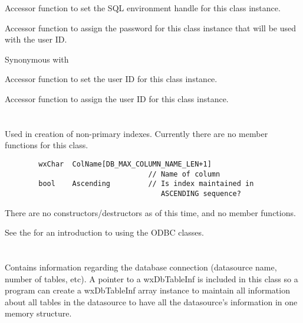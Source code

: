 
Accessor function to set the SQL environment handle for this class instance.

\label{wxdbconnectinfsetpassword}


Accessor function to assign the password for this class
instance that will be used with the user ID.

Synonymous with 

\label{wxdbconnectinfsetuid}


Accessor function to set the user ID for this class instance.

\label{wxdbconnectinfsetuserid}


Accessor function to assign the user ID for this class instance.

\section{}\label{wxdbidxdef}

Used in creation of non-primary indexes.  Currently there are no member
functions for this class.

\begin{verbatim}
        wxChar  ColName[DB_MAX_COLUMN_NAME_LEN+1]
                                  // Name of column
        bool    Ascending         // Is index maintained in
                                     ASCENDING sequence?
\end{verbatim}

There are no constructors/destructors as of this time, and no member functions.

See the  for
an introduction to using the ODBC classes.

\section{}\label{wxdbinf}

Contains information regarding the database connection (datasource name,
number of tables, etc).  A pointer to a wxDbTableInf is included in this
class so a program can create a wxDbTableInf array instance to maintain all
information about all tables in the datasource to have all the datasource's
information in one memory structure.

